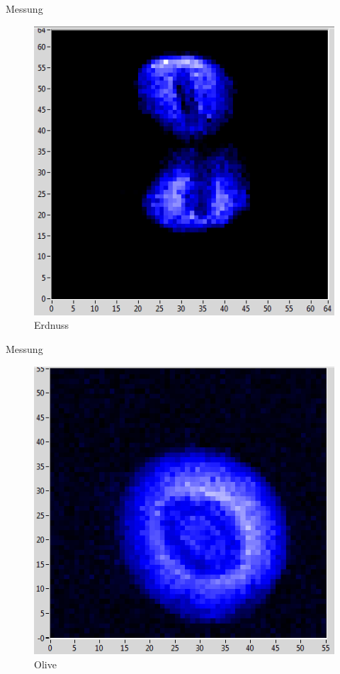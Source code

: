 \begin{frame}{Messung}
	\begin{figure}
	\centering
	\includegraphics[scale=.5]{..//figures//peanut.png}
	\caption{Erdnuss}
	\end{figure}
\end{frame}

\begin{frame}{Messung}
	\begin{figure}
	\centering
	\includegraphics[scale=.5]{..//figures//olive.png}
	\caption{Olive}
	\end{figure}
\end{frame}




